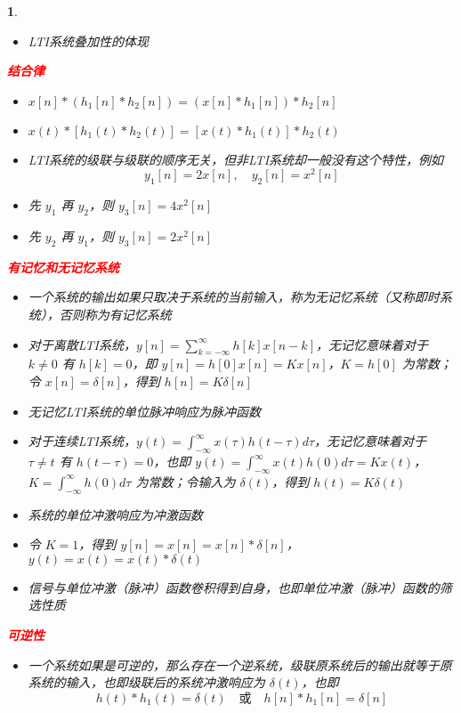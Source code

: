 \documentclass[UTF8]{report}
\theoremstyle{MyLineTheoremStyle} %
\theoremstyle{MyBlockTheoremStyle} %
\theoremstyle{MySubsubsectionStyle} %
\newtheorem{definition}{}
\begin{document}
\begin{definition}
\begin{itemize}
        \item LTI系统叠加性的体现
    \end{itemize}
\vspace{1em}
    \textbf{\textcolor{red}{结合律}}
    \begin{itemize}
        \item $x[n] * (h_1[n] * h_2[n]) = (x[n] * h_1[n]) * h_2[n]$
        \item $x(t) * [h_1(t) * h_2(t)] = [x(t) * h_1(t)] * h_2(t)$
        \item LTI系统的级联与级联的顺序无关，但非LTI系统却一般没有这个特性，例如
        \[
        y_1[n] = 2x[n], \quad y_2[n] = x^2[n]
        \]
        \item 先 $y_1$ 再 $y_2$，则 $y_3[n] = 4x^2[n]$
        \item 先 $y_2$ 再 $y_1$，则 $y_3[n] = 2x^2[n]$
    \end{itemize}
\vspace{1em}
    \textbf{\textcolor{red}{有记忆和无记忆系统}}
    \begin{itemize}
        \item 一个系统的输出如果只取决于系统的当前输入，称为无记忆系统（又称即时系统），否则称为有记忆系统
        \item 对于离散LTI系统，$y[n] = \sum_{k=-\infty}^{\infty} h[k] x[n - k]$，无记忆意味着对于 $k \neq 0$ 有 $h[k] = 0$，即 $y[n] = h[0] x[n] = K x[n]$，$K = h[0]$ 为常数；令 $x[n] = \delta[n]$，得到 $h[n] = K \delta[n]$
        \item 无记忆LTI系统的单位脉冲响应为脉冲函数
        \item 对于连续LTI系统，$y(t) = \int_{-\infty}^{\infty} x(\tau) h(t - \tau) d\tau$，无记忆意味着对于 $\tau \neq t$ 有 $h(t - \tau) = 0$，也即 $y(t) = \int_{-\infty}^{\infty} x(t) h(0) d\tau = K x(t)$，$K = \int_{-\infty}^{\infty} h(0) d\tau$ 为常数；令输入为 $\delta(t)$，得到 $h(t) = K \delta(t)$
        \item 系统的单位冲激响应为冲激函数
        \item 令 $K = 1$，得到 $y[n] = x[n] = x[n] * \delta[n]$，$y(t) = x(t) = x(t) * \delta(t)$
        \item 信号与单位冲激（脉冲）函数卷积得到自身，也即单位冲激（脉冲）函数的筛选性质
    \end{itemize}
\vspace{1em}
    \textbf{\textcolor{red}{可逆性}}
    \begin{itemize}
        \item 一个系统如果是可逆的，那么存在一个逆系统，级联原系统后的输出就等于原系统的输入，也即级联后的系统冲激响应为 $\delta(t)$，也即
    \[
    h(t) * h_1(t) = \delta(t) \quad \text{或} \quad h[n] * h_1[n] = \delta[n]
    \]
    

\end{itemize}
\end{definition}
\end{document}
